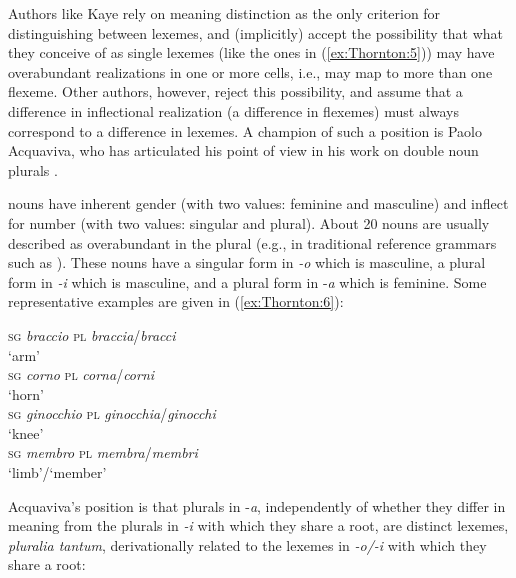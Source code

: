 \documentclass[output=paper]{langsci/langscibook}
\begin{document}
Authors like Kaye rely on meaning distinction as the only criterion for
distinguishing between lexemes, and (implicitly) accept the possibility
that what they conceive of as single lexemes (like the ones in (\ref{ex:Thornton:5})) may
have overabundant realizations in one or more cells, i.e., may map to
more than one flexeme. Other authors, however, reject this possibility,
and assume that a difference in inflectional realization (a difference
in flexemes) must always correspond to a difference in lexemes. A
champion of such a position is Paolo Acquaviva, who has articulated his
point of view in his work on  double noun plurals %
\citep{Acquaviva2008}%
%
.

 nouns have inherent gender (with two values: feminine and
masculine) and inflect for number (with two values: singular and
plural). About 20  nouns are usually described as overabundant in
the plural (e.g., in traditional reference grammars such as %
\citealt{BattagliaPernicone1954}%
%
). These nouns have a singular form in \emph{-o} which is
masculine, a plural form in \emph{-i} which is masculine, and a plural
form in -\emph{a} which is feminine. Some representative examples are
given in (\ref{ex:Thornton:6}):

\ea\label{ex:Thornton:6}  %
\citep{Acquaviva2008,Thornton2011b}%
%


\ea\label{ex:Thornton:6a}\textsc{sg} \emph{braccio} \textsc{pl} \emph{braccia}\slash{}\emph{bracci}\\
\glt `arm'\\

\ex\label{ex:Thornton:6b}\textsc{sg} \emph{corno} \textsc{pl} \emph{corna}\slash{}\emph{corni}\\
\glt `horn'\\

\ex\label{ex:Thornton:6c}\textsc{sg} \emph{ginocchio} \textsc{pl} \emph{ginocchia}\slash{}\emph{ginocchi} \\ \glt`knee'\\

\ex\label{ex:Thornton:6d}\textsc{sg} \emph{membro} \textsc{pl} \emph{membra}\slash{}\emph{membri}\\
\glt`limb'\slash{}`member'\\
\z
\z

Acquaviva's position is that plurals in -\emph{a}, independently of
whether they differ in meaning from the plurals in \emph{-i} with which
they share a root, are distinct lexemes, \emph{pluralia tantum},
derivationally related to the lexemes in \emph{-o\slash{}-i} with which they
share a root:
\end{document}

